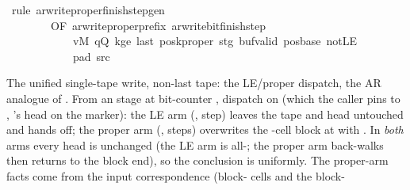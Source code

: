 \begin{isabellebody}
\isamarkupfalse%
\ {\isacharparenleft}{\kern0pt}rule\ ar{\isacharunderscore}{\kern0pt}write{\isacharunderscore}{\kern0pt}proper{\isacharunderscore}{\kern0pt}finish{\isacharunderscore}{\kern0pt}step{\isacharunderscore}{\kern0pt}gen\isanewline
\ \ \ \ \ \ \ \ {\isacharbrackleft}{\kern0pt}OF\ ar{\isacharunderscore}{\kern0pt}write{\isacharunderscore}{\kern0pt}proper{\isacharunderscore}{\kern0pt}prefix\ ar{\isacharunderscore}{\kern0pt}write{\isacharunderscore}{\kern0pt}bit{\isacharunderscore}{\kern0pt}finish{\isacharunderscore}{\kern0pt}step\isanewline
\ \ \ \ \ \ \ \ \ \ \ \ vM\ qQ\ kge{}\ last\ poskproper\ stg\ buf{\isacharunderscore}{\kern0pt}valid\ pos{\isacharunderscore}{\kern0pt}base\ notLE\isanewline
\ \ \ \ \ \ \ \ \ \ \ \ pad{}\ src{}{\isacharbrackright}{\kern0pt}{\isacharparenright}{\kern0pt}%
\endisatagproof
{\isafoldproof}%
%
\isadelimproof
%
\endisadelimproof
%
\begin{isamarkuptext}%
The unified single-tape write, non-last tape: the LE/proper
  dispatch, the AR analogue of .  From an
   stage at bit-counter , dispatch on
   (which the caller pins to ,
  's head on the marker): the LE arm
  (,  step) leaves the tape and head
  untouched and hands off; the proper arm (,
   steps) overwrites the -cell block at  with .  In \emph{both}
  arms every head is unchanged (the LE arm is all-; the proper
  arm back-walks then returns to the block end), so the conclusion is
   uniformly.  The proper-arm
   facts come from the input correspondence
   (block- cells and the block-

\end{isamarkuptext}
\end{isabellebody}
